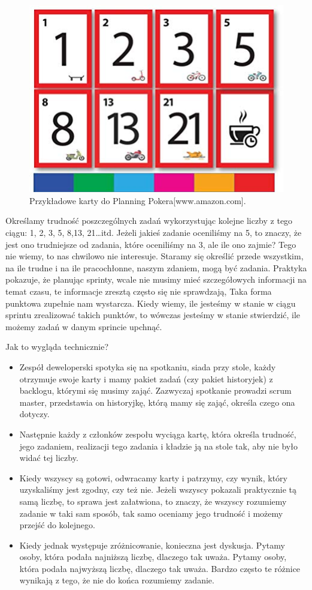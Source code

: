 \begin{figure}
	\centering\includegraphics[width=.4\textwidth]{img/Planning_Poker}
	\caption{Przykładowe karty do Planning Pokera[www.amazon.com].}\label{rysunek:poker}
\end{figure}

Określamy trudność poszczególnych zadań wykorzystując kolejne liczby z tego ciągu: 1, 2, 3, 5, 8,13, 21…itd. Jeżeli jakieś zadanie oceniliśmy na 5, to znaczy, że jest ono trudniejsze od zadania, które oceniliśmy na 3, ale ile ono zajmie? Tego nie wiemy, to nas chwilowo nie interesuje. Staramy się określić przede wszystkim, na ile trudne i na ile pracochłonne, naszym zdaniem, mogą być zadania.
Praktyka pokazuje, że planując sprinty, wcale nie musimy mieć szczegółowych informacji na temat czasu, te informacje zresztą często się nie sprawdzają, Taka forma punktowa zupełnie nam wystarcza. Kiedy wiemy, ile jesteśmy w stanie w ciągu sprintu zrealizować takich punktów, to wówczas jesteśmy w stanie stwierdzić, ile możemy zadań w danym sprincie upchnąć.

Jak to wygląda technicznie?

\begin{itemize}
	\item Zespół deweloperski spotyka się na spotkaniu, siada przy stole, każdy otrzymuje swoje karty i mamy pakiet zadań (czy pakiet historyjek) z backlogu, którymi się musimy zająć. Zazwyczaj spotkanie prowadzi scrum master, przedstawia on historyjkę, którą mamy się zająć, określa czego ona dotyczy.
	\item Następnie każdy z członków zespołu wyciąga kartę, która określa trudność, jego zadaniem, realizacji tego zadania i kładzie ją na stole tak, aby nie było widać tej liczby.
	\item Kiedy wszyscy są gotowi, odwracamy karty i patrzymy, czy wynik, który uzyskaliśmy jest zgodny, czy też nie. Jeżeli wszyscy pokazali praktycznie tą samą liczbę, to sprawa jest załatwiona, to znaczy, że wszyscy rozumiemy zadanie w taki sam sposób, tak samo oceniamy jego trudność i możemy przejść do kolejnego. 
	\item Kiedy jednak występuje zróżnicowanie, konieczna jest dyskusja. Pytamy osoby, która podała najniższą liczbę, dlaczego tak uważa. Pytamy osoby, która podała najwyższą liczbę, dlaczego tak uważa. Bardzo często te różnice wynikają z tego, że nie do końca rozumiemy zadanie.
\end{itemize}

